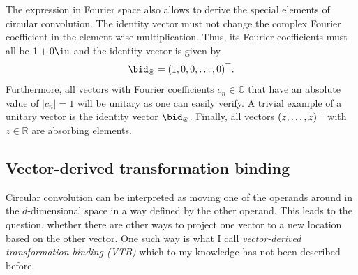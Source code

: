 The expression in Fourier space also allows to derive the special elements of circular convolution.
The identity vector must not change the complex Fourier coefficient in the element-wise multiplication.
Thus, its Fourier coefficients must all be $1 + 0\iu$ and the identity vector is given by
\begin{equation}
    \bid_{\circledast} = (1, 0, 0, \dotsc, 0)\Tr \text{.}
\end{equation}
Furthermore, all vectors with Fourier coefficients $c_n \in \mathbb{C}$ that have an absolute value of $\left|c_n\right| = 1$ will be unitary as one can easily verify.
A trivial example of a unitary vector is the identity vector $\bid_{\circledast}$.
Finally, all vectors $(z, \dotsc, z)^{\top}$ with $z \in \mathbb{R}$ are absorbing elements.

\subsection{Vector-derived transformation binding}
Circular convolution can be interpreted as moving one of the operands around in the $d$-dimensional space in a way defined by the other operand.
This leads to the question, whether there are other ways to project one vector to a new location based on the other vector.
One such way is what I call \emph{vector-derived transformation binding (VTB)} which to my knowledge has not been described before.
